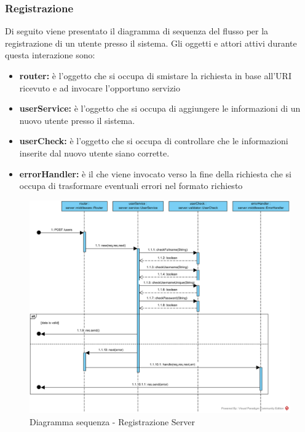 \documentclass[12pt,a4paper]{article}
\begin{document}
\newpage
\subsubsection{Registrazione}
Di seguito viene presentato il diagramma di sequenza del flusso per la registrazione di un utente presso il sistema. Gli oggetti e attori attivi durante questa interazione sono:

\begin{itemize}
	\item \textbf{router:} è l'oggetto che si occupa di smistare la richiesta in base all’URI ricevuto e ad invocare l’opportuno servizio	
	\item \textbf{userService:}  è l'oggetto che si occupa di aggiungere le informazioni di un nuovo utente presso il sistema.
	\item \textbf{userCheck:} è l'oggetto che si occupa di controllare che le informazioni inserite dal nuovo utente siano corrette.
	\item \textbf{errorHandler:} è il  che viene invocato verso la fine della richiesta che si occupa di trasformare eventuali errori nel formato  richiesto
\end{itemize}

\begin{center}
	\begin{figure}[H]
		\centering \includegraphics[max width=\myheight, angle=90]{../img/diagrammiSequenza/registrazioneServer.png}
		\caption{Diagramma sequenza - Registrazione Server}
	\end{figure}
\end{center}
\end{document}
